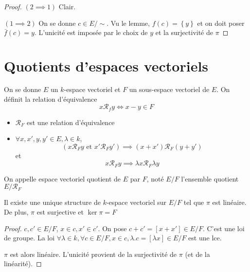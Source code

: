 \begin{proof}
    $(2 \implies 1)$ Clair.

    $(1 \implies  2)$ On se donne $c \in  E / \sim$. Vu le lemme, $f(c)= \left\{ y \right\} $ et on doit poser $\bar f(c)=y$. L'unicité est imposée par le choix de $y$ et la surjectivité de  $\pi$
\end{proof}

\section{Quotients d'espaces vectoriels}

\begin{dfn}
On se donne $E$ un  $k$-espace vectoriel et $F$ un sous-espace vectoriel de  $E$. On définit la relation d'équivalence \[
x \mathcal  R_f y \iff  x-y \in  F
\] 
\end{dfn}

\begin{prop}
\begin{itemize}
    \item $\mathcal  R_F$ est une relation d'équivalence
    \item $\forall  x, x', y, y' \in E, \lambda \in  k$, \[
            (x \mathcal R_F y \text{ et }x'\mathcal R_Fy' )\implies (x+x')\mathcal  R_F(y+y')
    \] 
    et \[
        x\mathcal R_F y \implies \lambda x \mathcal  R_F \lambda y
    \] 
\end{itemize}
\end{prop}

\begin{dfn}
    On appelle espace vectoriel quotient de $E$ par  $F$, noté  $E / F$ l'ensemble quotient $E / \mathcal R_F$
\end{dfn}

\begin{prop}
Il existe une unique structure de $k$-espace vectoriel sur $E / F$ tel que  $ \pi$ est linéaire. De plus, $\pi$ est surjective et $\ker \pi = F$
\end{prop}

\begin{proof}
    $c, c' \in  E / F$, $x \in c, x' \in  c'$. On pose $c+c'=[x+x'] \in  E / F$. C'est une loi de groupe. La loi $\forall  \lambda \in  k, \forall  c \in  E / F, x \in  c, \lambda.c=[\lambda x] \in  E / F$ est une lce.

    $\pi$ est alors linéaire. L'unicité provient de la surjectivité de $ \pi$ (et de la linéarité).
\end{proof}

